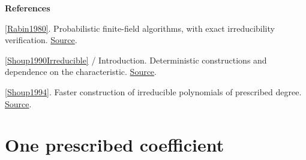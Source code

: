 \documentclass[11pt,a4paper,oneside,openany]{book}
\newenvironment{sources}{\par\smallskip\begingroup\footnotesize\color{atlasgray}\leftskip=10pt\setlength{\parskip}{2pt}}{\par\endgroup\smallskip}
\begin{document}
\begin{sources}
\textbf{References}\par\smallskip
\noindent\hyperlink{ref:Rabin1980}{[Rabin1980]}. Probabilistic finite-field algorithms, with exact irreducibility verification. \href{https://doi.org/10.1137/0209024}{Source}.\par
\noindent\hyperlink{ref:Shoup1990Irreducible}{[Shoup1990Irreducible]} / Introduction. Deterministic constructions and dependence on the characteristic. \href{https://www.shoup.net/papers/detirred.pdf}{Source}.\par
\noindent\hyperlink{ref:Shoup1994}{[Shoup1994]}. Faster construction of irreducible polynomials of prescribed degree. \href{https://doi.org/10.1006/jsco.1994.1025}{Source}.\par
\end{sources}\color{black}
\section{One prescribed coefficient}
\end{document}
